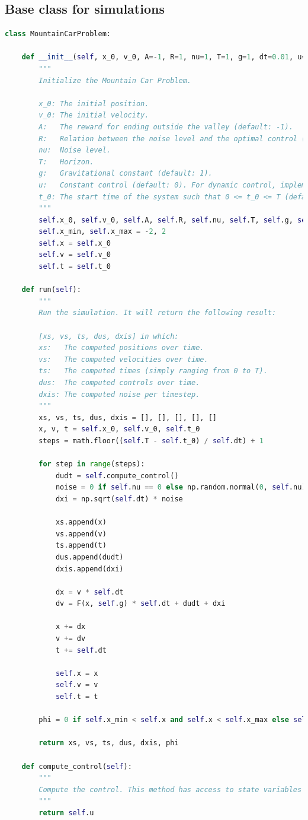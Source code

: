 \documentclass[10pt,a4paper]{article}
\begin{document}
\subsection{Base class for simulations}
\begin{lstlisting}[language=Python]
class MountainCarProblem:
    
    def __init__(self, x_0, v_0, A=-1, R=1, nu=1, T=1, g=1, dt=0.01, u=0, t_0=0):
        """
        Initialize the Mountain Car Problem.
        
        x_0: The initial position.
        v_0: The initial velocity.
        A:   The reward for ending outside the valley (default: -1).
        R:   Relation between the noise level and the optimal control (default: 1).
        nu:  Noise level.
        T:   Horizon.
        g:   Gravitational constant (default: 1).
        u:   Constant control (default: 0). For dynamic control, implement the compute_control method.
        t_0: The start time of the system such that 0 <= t_0 <= T (default: t_0=0).
        """
        self.x_0, self.v_0, self.A, self.R, self.nu, self.T, self.g, self.dt, self.u, self.t_0 = x_0, v_0, A, R, nu, T, g, dt, u, t_0
        self.x_min, self.x_max = -2, 2
        self.x = self.x_0
        self.v = self.v_0
        self.t = self.t_0
        
    def run(self):
        """
        Run the simulation. It will return the following result:
        
        [xs, vs, ts, dus, dxis] in which:
        xs:   The computed positions over time.
        vs:   The computed velocities over time.
        ts:   The computed times (simply ranging from 0 to T).
        dus:  The computed controls over time.
        dxis: The computed noise per timestep.
        """
        xs, vs, ts, dus, dxis = [], [], [], [], []
        x, v, t = self.x_0, self.v_0, self.t_0
        steps = math.floor((self.T - self.t_0) / self.dt) + 1
        
        for step in range(steps):
            dudt = self.compute_control()
            noise = 0 if self.nu == 0 else np.random.normal(0, self.nu)
            dxi = np.sqrt(self.dt) * noise
            
            xs.append(x)
            vs.append(v)
            ts.append(t)
            dus.append(dudt)
            dxis.append(dxi)
            
            dx = v * self.dt
            dv = F(x, self.g) * self.dt + dudt + dxi
            
            x += dx
            v += dv
            t += self.dt
            
            self.x = x
            self.v = v
            self.t = t
            
        phi = 0 if self.x_min < self.x and self.x < self.x_max else self.A
            
        return xs, vs, ts, dus, dxis, phi
        
    def compute_control(self):
        """
        Compute the control. This method has access to state variables self.x (position), self.v (velocity) and self.t (time).
        """
        return self.u
\end{lstlisting}
\end{document}
